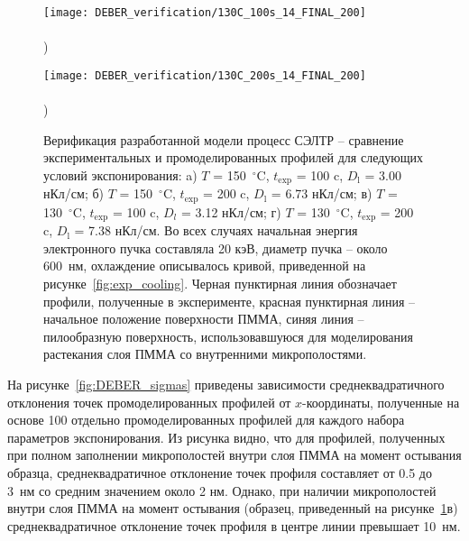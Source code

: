 \begin{figure}[h!]
	\begin{minipage}{0.48\textwidth}
		\texttt{[image: DEBER\_verification/130C\_100s\_14\_FINAL\_200]} \\
		\vspace{-13em} \\ ) \\ \vspace{13em}
	\end{minipage}
	\begin{minipage}{0.48\textwidth}
		\texttt{[image: DEBER\_verification/130C\_200s\_14\_FINAL\_200]} \\
		\vspace{-13em} \\ ) \\ \vspace{13em}
	\end{minipage}
	\vspace{-3em}
	\caption{
		Верификация разработанной модели процесс СЭЛТР -- сравнение экспериментальных и промоделированных профилей для следующих условий экспонирования: a) $T$ = 150~$^\circ$C, $t_\mathrm{exp}$ = 100 c, $D_\mathrm{l}$ = 3.00 нКл/см; б) $T$ = 150~$^\circ$C, $t_\mathrm{exp}$ = 200 c, $D_\mathrm{l}$ = 6.73 нКл/см; в) $T$ = 130~$^\circ$C, $t_\mathrm{exp}$ = 100 c, $D_l$ = 3.12 нКл/см; \linebreak г) $T$ = 130~$^\circ$C, $t_\mathrm{exp}$ = 200 c, $D_\mathrm{l}$ = 7.38 нКл/см.
		Во всех случаях начальная энергия электронного пучка составляла 20 кэВ, диаметр пучка -- около 600~нм, охлаждение описывалось кривой, приведенной на рисунке~\ref{fig:exp_cooling}.
		Черная пунктирная линия обозначает профили, полученные в эксперименте, красная пунктирная линия -- начальное положение поверхности ПММА, синяя линия -- пилообразную поверхность, использовавшуюся для моделирования растекания слоя ПММА со внутренними микрополостями.}
	\label{fig:DEBER_4_profiles}
	\vspace{1em}
\end{figure}

На рисунке~\ref{fig:DEBER_sigmas} приведены зависимости среднеквадратичного отклонения точек промоделированных профилей от $x$-координаты, полученные на основе 100 отдельно промоделированных профилей для каждого набора параметров экспонирования.
Из рисунка видно, что для профилей, полученных при полном заполнении микрополостей внутри слоя ПММА на момент остывания образца, среднеквадратичное отклонение точек профиля составляет от 0.5 до 3~нм со средним значением около 2 нм.
Однако, при наличии микрополостей внутри слоя ПММА на момент остывания (образец, приведенный на рисунке~\ref{fig:DEBER_4_profiles}в) среднеквадратичное отклонение точек профиля в центре линии превышает 10~нм.


